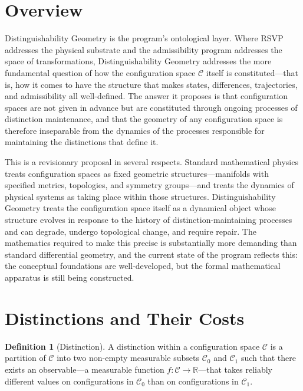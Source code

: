 \documentclass[11pt, oneside]{book}
\theoremstyle{definition}
\newtheorem{definition}{Definition}[chapter]
\theoremstyle{remark}
\begin{document}
\section{Overview}

Distinguishability Geometry is the program's ontological layer. Where RSVP addresses the physical substrate and the admissibility program addresses the space of transformations, Distinguishability Geometry addresses the more fundamental question of how the configuration space $\mathcal{C}$ itself is constituted—that is, how it comes to have the structure that makes states, differences, trajectories, and admissibility all well-defined. The answer it proposes is that configuration spaces are not given in advance but are constituted through ongoing processes of distinction maintenance, and that the geometry of any configuration space is therefore inseparable from the dynamics of the processes responsible for maintaining the distinctions that define it.

This is a revisionary proposal in several respects. Standard mathematical physics treats configuration spaces as fixed geometric structures—manifolds with specified metrics, topologies, and symmetry groups—and treats the dynamics of physical systems as taking place within those structures. Distinguishability Geometry treats the configuration space itself as a dynamical object whose structure evolves in response to the history of distinction-maintaining processes and can degrade, undergo topological change, and require repair. The mathematics required to make this precise is substantially more demanding than standard differential geometry, and the current state of the program reflects this: the conceptual foundations are well-developed, but the formal mathematical apparatus is still being constructed.

\section{Distinctions and Their Costs}

\begin{definition}[Distinction]
A distinction within a configuration space $\mathcal{C}$ is a partition of $\mathcal{C}$ into two non-empty measurable subsets $\mathcal{C}_0$ and $\mathcal{C}_1$ such that there exists an observable—a measurable function $f : \mathcal{C} \to \mathbb{R}$—that takes reliably different values on configurations in $\mathcal{C}_0$ than on configurations in $\mathcal{C}_1$.
\end{definition}
\end{document}
